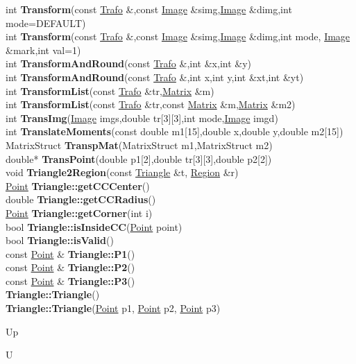 \documentclass[10pt,titlepage]{article}
\def\functionlistentry#1#2#3#4#5#6{\noindent #1 {\bf #2}(#3) \dotfill #6\\}
\def\letterref#1{}
\def\letterlabel#1{\vspace{0.5cm}\centerline{\Large #1}}
\begin{document}
{{\functionlistentry{int}{Transform}{const \hyperlink{Trafo}{Trafo} \&,const \hyperlink{Image}{Image} \&simg,\hyperlink{Image}{Image} \&dimg,int mode=DEFAULT}{726}{geoTrafo}{}
\functionlistentry{int}{Transform}{const \hyperlink{Trafo}{Trafo} \&,const \hyperlink{Image}{Image} \&simg,\hyperlink{Image}{Image} \&dimg,int mode, \hyperlink{Image}{Image} \&mark,int val=1}{727}{geoTrafo}{}
\functionlistentry{int}{TransformAndRound}{const \hyperlink{Trafo}{Trafo} \&,int \&x,int \&y}{718}{geoTrafo}{}
\functionlistentry{int}{TransformAndRound}{const \hyperlink{Trafo}{Trafo} \&,int x,int y,int \&xt,int \&yt}{719}{geoTrafo}{}
\functionlistentry{int}{TransformList}{const \hyperlink{Trafo}{Trafo} \&tr,\hyperlink{Matrix}{Matrix} \&m}{723}{geoTrafo}{}
\functionlistentry{int}{TransformList}{const \hyperlink{Trafo}{Trafo} \&tr,const \hyperlink{Matrix}{Matrix} \&m,\hyperlink{Matrix}{Matrix} \&m2}{724}{geoTrafo}{}
\functionlistentry{int}{TransImg}{\hyperlink{Image}{Image} imgs,double tr[3][3],int mode,\hyperlink{Image}{Image} imgd}{1592}{obsolet}{}
\functionlistentry{int}{TranslateMoments}{const double m1[15],double x,double y,double m2[15]}{1607}{obsolet}{}
\functionlistentry{MatrixStruct}{TranspMat}{MatrixStruct m1,MatrixStruct m2}{1579}{obsolet}{}
\functionlistentry{double*}{TransPoint}{double p1[2],double tr[3][3],double p2[2]}{1591}{obsolet}{}
\functionlistentry{void}{Triangle2Region}{const \hyperlink{Triangle}{Triangle} \&t, \hyperlink{Region}{Region} \&r}{590}{geoObject}{}
\functionlistentry{\hyperlink{Point}{Point}}{Triangle::getCCCenter}{}{587}{geoObject}{}
\functionlistentry{double}{Triangle::getCCRadius}{}{588}{geoObject}{}
\functionlistentry{\hyperlink{Point}{Point}}{Triangle::getCorner}{int i}{583}{geoObject}{}
\functionlistentry{bool}{Triangle::isInsideCC}{\hyperlink{Point}{Point} point}{589}{geoObject}{}
\functionlistentry{bool}{Triangle::isValid}{}{582}{geoObject}{}
\functionlistentry{const \hyperlink{Point}{Point} \&}{Triangle::P1}{}{584}{geoObject}{}
\functionlistentry{const \hyperlink{Point}{Point} \&}{Triangle::P2}{}{585}{geoObject}{}
\functionlistentry{const \hyperlink{Point}{Point} \&}{Triangle::P3}{}{586}{geoObject}{}
\functionlistentry{}{Triangle::Triangle}{}{580}{geoObject}{}
\functionlistentry{}{Triangle::Triangle}{\hyperlink{Point}{Point} p1, \hyperlink{Point}{Point} p2, \hyperlink{Point}{Point} p3}{581}{geoObject}{}

\letterlabel{Up}
\letterlabel{U}
\letterref{A}
\letterref{B}
\letterref{C}
\letterref{D}
\letterref{E}
\letterref{F}
\letterref{G}
\letterref{H}
\letterref{I}
\letterref{K}
\letterref{L}
\letterref{M}
\letterref{N}
\letterref{O}
\letterref{P}
\letterref{Q}
\letterref{R}
\letterref{S}
\letterref{T}
\letterref{U}
\letterref{V}
\letterref{W}
\letterref{X}
\letterref{Y}
\letterref{Z}

}}
\end{document}
